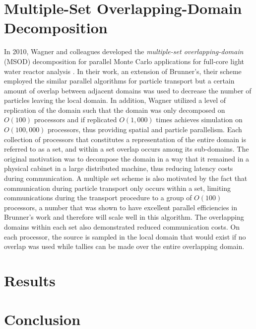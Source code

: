 \documentclass[letterpaper,12pt]{article}
\begin{document}
\section{Multiple-Set Overlapping-Domain Decomposition}

In 2010, Wagner and colleagues developed the \textit{multiple-set
  overlapping-domain} (MSOD) decomposition for parallel Monte Carlo
applications for full-core light water reactor analysis
\cite{wagner_hybrid_2010}. In their work, an extension of Brunner's,
their scheme employed the similar parallel algorithms for particle
transport but a certain amount of overlap between adjacent domains was
used to decrease the number of particles leaving the local domain. In
addition, Wagner utilized a level of replication of the domain such
that the domain was only decomposed on $O(100)$ processors and if
replicated $O(1,000)$ times achieves simulation on $O(100,000)$
processors, thus providing spatial and particle parallelism. Each
collection of processors that constitutes a representation of the
entire domain is referred to as a set, and within a set overlap occurs
among its sub-domains. The original motivation was to decompose the
domain in a way that it remained in a physical cabinet in a large
distributed machine, thus reducing latency costs during
communication. A multiple set scheme is also motivated by the fact
that communication during particle transport only occurs within a set,
limiting communications during the transport procedure to a group of
$O(100)$ processors, a number that was shown to have excellent
parallel efficiencies in Brunner's work and therefore will scale well
in this algorithm. The overlapping domains within each set also
demonstrated reduced communication costs. On each processor, the
source is sampled in the local domain that would exist if no overlap
was used while tallies can be made over the entire overlapping domain.


\section{Results}

\section{Conclusion}

\pagebreak


\end{document}
